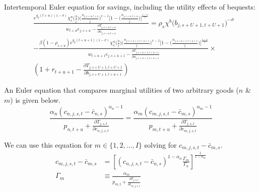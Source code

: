     Intertemporal Euler equation for savings, including the utility effects of bequests:
    \begin{equation}\label{EqbEuler}
      \begin{split}
      & \frac{ e^{g_y (t+u)(1-\sigma)}\chi^n_{s}\biggl(\frac{b}{\tilde{l}}\biggr)\biggl(\frac{n_{j,s+u,t+u}}{\tilde{l}}\biggr)^{v-1}\Biggl[1 - \biggl(\frac{n_{j,s+u,t+u}}{\tilde{l}}\biggr)\Biggr]^{\frac{1-v}{v}} } { w_{t+u} e_{j,s+u} - \frac{\partial T_{j,s+u,t+u}}{\partial n_{j,s+u,t+u}} } = \rho_s\chi^b\bigl(b_{j,s+U+1,t+U+1}\bigr)^{-\sigma}\\ 
      &  - \frac{ \beta(1-\rho_{s+u}) e^{g_y (t+u+1)(1-\sigma)}\chi^n_{s}\biggl(\frac{b}{\tilde{l}}\biggr)\biggl(\frac{n_{j,s+u+1,t+u+1}}{\tilde{l}}\biggr)^{v-1}\Biggl[1 - \biggl(\frac{n_{j,s+u+1,t+u+1}}{\tilde{l}}\biggr)\Biggr]^{\frac{1-v}{v}} } { w_{t+u+1} e_{j,s+u+1} - \frac{\partial T_{j,s+u+1,t+u+1}}{\partial n_{j,s+u+1,t+u+1}} } \times \\
      & \left( 1 + r_{t+u+1} - \frac{\partial T_{j,s+U+1,t+U+1}}{\partial b_{j,s+U+1,t+u+1}} \right)
      \end{split}
    \end{equation}



    An Euler equation that compares marginal utilities of two arbitrary goods ($n$ \& $m$) is given below.
    \begin{equation}\label{EqcEuler2}
      \frac{ \alpha_n \left( c_{n,j,s,t} - \bar c_{n,s} \right)^{\alpha_n-1} } { p_{n,t+u} + \frac{\partial T_{j,s,t}}{\partial c_{n,j,s,t}} } = \frac{ \alpha_m \left( c_{m,j,s,t} - \bar c_{m,s} \right)^{\alpha_m-1} } { p_{m,t+u} + \frac{\partial T_{j,s,t}}{\partial c_{m,j,s,t}} }
    \end{equation}

    We can use this equation for $m \in \{1,2,...,I\}$ solving for $c_{m,j,s,t} - \bar c_{m,s}$.
    \begin{align}
        c_{m,j,s,t} - \bar c_{m,s} & = \left[ \left(c_{n,j,s,t} - \bar c_{n,s} \right)^{1-\alpha_n} \frac{\Gamma_m}{\Gamma_n} \right]^{\frac{1}{1-\alpha_m}}  \label{Eqcmdef} \\
        \Gamma_m & \equiv \frac{ \alpha_m } { p_{m,t} + \frac{\partial T_{j,s,t}}{\partial c_{m,j,s,t}} } \nonumber
    \end{align}

